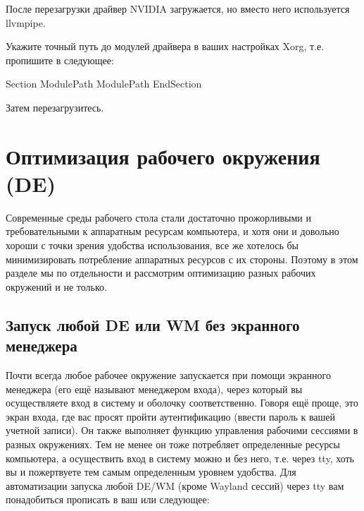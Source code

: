 \documentclass[letterpaper,10pt,russian,openany]{sphinxmanual}
\begin{document}
\sphinxAtStartPar
{} После перезагрузки драйвер NVIDIA загружается, но вместо него используется llvmpipe.

\sphinxAtStartPar
{} Укажите точный путь до модулей драйвера в ваших настройках Xorg, т.е. пропишите в  следующее:

\begin{sphinxVerbatim}[commandchars=\\\{\}]
Section 
  ModulePath 
  ModulePath 
EndSection
\end{sphinxVerbatim}

\sphinxAtStartPar
Затем перезагрузитесь.

\sphinxstepscope


\chapter{Оптимизация рабочего окружения (DE)}
\label{\detokenize{source/de-optimizations:de}}\label{\detokenize{source/de-optimizations:de-optimizations}}\label{\detokenize{source/de-optimizations::doc}}
\sphinxAtStartPar
Современные среды рабочего стола стали достаточно прожорливыми и требовательными к аппаратным ресурсам компьютера,
и хотя они и довольно хороши с точки зрения удобства использования,
все же хотелось бы минимизировать потребление аппаратных ресурсов с их стороны.
Поэтому в этом разделе мы по отдельности и рассмотрим оптимизацию разных рабочих окружений и не только.

\ignorespaces 

\section{Запуск любой DE или WM без экранного менеджера }
\label{\detokenize{source/de-optimizations:de-wm-x11}}\label{\detokenize{source/de-optimizations:launch-without-display-manager}}\label{\detokenize{source/de-optimizations:index-0}}
\sphinxAtStartPar
Почти всегда любое рабочее окружение запускается при помощи экранного менеджера (его ещё называют менеджером входа),
через который вы осуществляете вход в систему и оболочку соответственно.
Говоря ещё проще, это экран входа, где вас  просят пройти аутентификацию (ввести пароль к вашей учетной записи).
Он также выполняет функцию  управления рабочими сессиями в разных окружениях.
Тем не менее он тоже потребляет определенные ресурсы компьютера, а осуществить вход в систему можно и без него,
т.е. через tty, хоть вы и пожертвуете тем самым определенным уровнем удобства.
Для автоматизации запуска любой DE/WM (кроме Wayland сессий) через tty вам понадобиться прописать в ваш  или  следующее:
\end{document}
